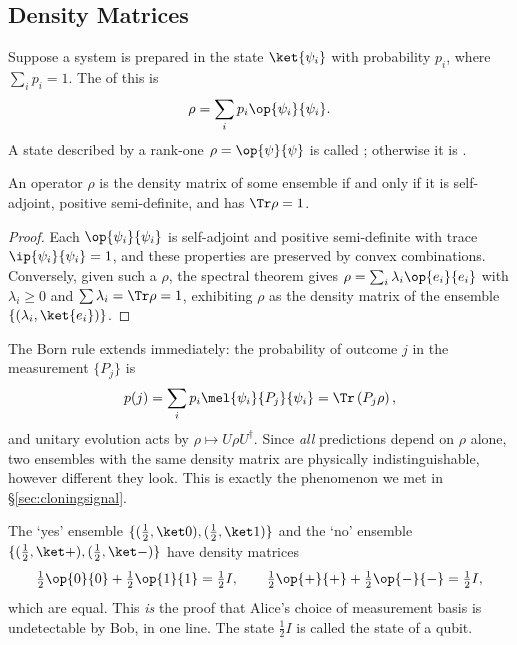 \subsection{Density Matrices}

\begin{definition}
	Suppose a system is prepared in the state $\ket{\psi_i}$ with probability $p_i$, where $\sum_ip_i=1$. The  of this  is
	$$\rho = \sum_ip_i\op{\psi_i}{\psi_i}.$$
	A state described by a rank-one $\rho = \op{\psi}{\psi}$ is called ; otherwise it is .
\end{definition}

\begin{proposition}
	An operator $\rho$ is the density matrix of some ensemble if and only if it is self-adjoint, positive semi-definite, and has $\Tr\rho = 1$.
\end{proposition}

\begin{proof}
	Each $\op{\psi_i}{\psi_i}$ is self-adjoint and positive semi-definite with trace $\ip{\psi_i}{\psi_i} = 1$, and these properties are preserved by convex combinations. Conversely, given such a $\rho$, the spectral theorem gives $\rho = \sum_i\lambda_i\op{e_i}{e_i}$ with $\lambda_i\geq0$ and $\sum\lambda_i = \Tr\rho = 1$, exhibiting $\rho$ as the density matrix of the ensemble $\{(\lambda_i,\ket{e_i})\}$.
\end{proof}

The Born rule extends immediately: the probability of outcome $j$ in the measurement $\{P_j\}$ is
$$p(j) = \sum_ip_i\mel{\psi_i}{P_j}{\psi_i} = \Tr\left(P_j\rho\right),$$
and unitary evolution acts by $\rho\mapsto U\rho U^\dagger$. Since \emph{all} predictions depend on $\rho$ alone, two ensembles with the same density matrix are physically indistinguishable, however different they look. This is exactly the phenomenon we met in \S\ref{sec:cloningsignal}.

\begin{example}
	The `yes' ensemble $\{(\tfrac12,\ket0),(\tfrac12,\ket1)\}$ and the `no' ensemble $\{(\tfrac12,\ket+),(\tfrac12,\ket-)\}$ have density matrices
	$$\tfrac12\op{0}{0}+\tfrac12\op{1}{1} = \tfrac12 I, \qquad \tfrac12\op{+}{+} + \tfrac12\op{-}{-} = \tfrac12I,$$
	which are equal. This \emph{is} the proof that Alice's choice of measurement basis is undetectable by Bob, in one line. The state $\tfrac12I$ is called the  state of a qubit.
\end{example}

